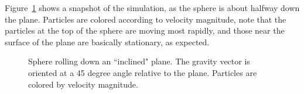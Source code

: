 \documentclass[fleqn]{article}
\begin{document}
Figure~\ref{figplane_sphere} shows a snapshot of the simulation, as
the sphere is about halfway down the plane.  Particles are colored according
to velocity magnitude, note that the particles at the top of the sphere
are moving most rapidly, and those near the surface of the plane are 
basically stationary, as expected.
\begin{figure}[b]
  \center
  \caption{Sphere rolling down an ``inclined" plane.  The gravity vector
is oriented at a 45 degree angle relative to the plane.  Particles are colored
by velocity magnitude.}
  \label{figplane_sphere}
\end{figure}


\end{document}
